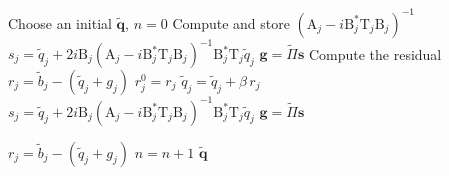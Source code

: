 \documentclass[a4paper,11pt]{article}
\newcommand{\mA}{\mathrm{A}}
\newcommand{\mB}{\mathrm{B}}
\newcommand{\mT}{\mathrm{T}}
\newcommand{\bq}{\boldsymbol{q}}
\newcommand{\bg}{\boldsymbol{g}}
\newcommand{\bs}{\boldsymbol{s}}
\newcommand{\br}{\boldsymbol{r}}
\begin{document}
\begin{algorithm}[H]
  \caption{GOSM with Richardson iteration}\label{alg:iterative_procedure}
  \begin{algorithmic}[1]
    \State Choose an initial \(\tilde{\bq}\), \(n=0\)
        \State Compute and store \(\left(\mA_j -i \mB_j^* \mT_j \mB_j\right)^{-1}\) \label{line:LU}
        \State \(s_j = \tilde{q}_j + 2 i \mB_j \left(\mA_j -i \mB_j^* \mT_j \mB_j\right)^{-1} \mB_j^* \mT_j \tilde{q}_j\) 
    \EndFor
    \State \(\bg = \tilde{\Pi} \bs\) \label{line:exchangeOp1}
        \State Compute the residual \(r_j = \tilde{b}_j - (\tilde{q}_j + g_j)\)
        \State \(r_j^0 = r_j\)
    \EndFor
    \While{ \(\lVert \br \rVert_2 > \varepsilon \, \lVert \br^0 \rVert_2\) and \( n < N\)}  \label{line:stopping}
        \State \(\tilde{q}_j = \tilde{q}_j + \beta \, r_j\)\label{line:core1}
        \State \(s_j = \tilde{q}_j + 2 i \mB_j \left(\mA_j -i \mB_j^* \mT_j \mB_j\right)^{-1} \mB_j^* \mT_j \tilde{q}_j\) 
      \EndFor
      \State \(\bg = \tilde{\Pi} \bs\) \label{line:exchangeOp2} 

        \State \(r_j = \tilde{b}_j - (\tilde{q}_j + g_j)\)\label{line:core2}
      \EndFor
      \State \(n=n+1\)
    \EndWhile
    \State \Return \(\tilde{\bq}\)
  \end{algorithmic}
\end{algorithm}
\end{document}
